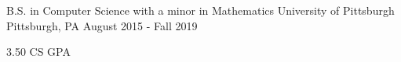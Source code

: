 
\vspace{-7mm}


\vspace{-1mm}
\begin{cventries}

  \cventry
    {B.S. in Computer Science with a minor in Mathematics} %
    {University of Pittsburgh} %
    {Pittsburgh, PA} %
    {August 2015 - Fall 2019} %
    {
      \begin{cvitems} %
        \item {3.50 CS GPA}
      \end{cvitems}
    }
    
  \vspace{-6mm}
  
\end{cventries}